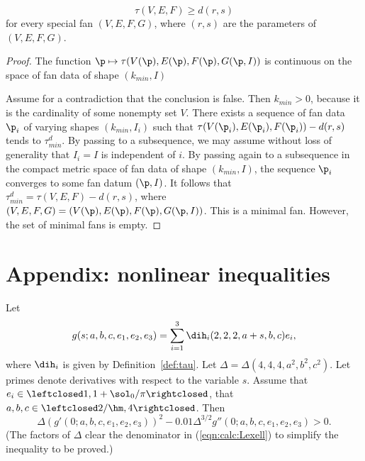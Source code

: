 \begin{corollary}\label{lemma:empty-d}
\begin{displaymath}
\tau(V,E,F) \ge d (r,s)
\end{displaymath}
for every special fan $(V,E,F,G)$, where $(r,s)$ are the parameters of
$(V,E,F,G)$.
\end{corollary}

\begin{proof} 
The function $\p\mapsto \tau(V(\p),E(\p),F(\p),G(\p,I))$ is
continuous on the space of fan data of shape $(k_{min},I)$

Assume for a contradiction that the conclusion is false.  Then
$k_{min}>0$, because it is the cardinality of some nonempty set $V$.
There exists a sequence of fan data $\p_i$ of varying shapes
$(k_{min},I_i)$ such that $\tau(V(\p_i),E(\p_i),F(\p_i))-d(r,s)$
tends to $\tau^d_{min}$.  By passing to a subsequence, we may assume
without loss of generality that $I_i = I$ is independent of $i$.  By
passing again to a subsequence in the compact metric space of fan
data of shape $(k_{min},I)$, the sequence $\p_i$ converges to some
fan datum $(\p,I)$.  It follows that $\tau^d_{min} =
\tau(V,E,F)-d(r,s)$, where $(V,E,F,G)=(V(\p),E(\p),F(\p),G(\p,I))$.
This is a minimal fan.  However, the set of minimal fans is empty.
\end{proof}


\section{Appendix: nonlinear inequalities}

\begin{calculation}\label{calc:Lexell}
Let
\begin{displaymath}
g(s;a,b,c,e_1,e_2,e_3) = \sum_{i=1}^3 \dih_i(2,2,2,a+s,b,c) e_i,
\end{displaymath}
where $\dih_i$ is given by Definition~\ref{def:tau}.
Let $\Delta = \Delta(4,4,4,a^2,b^2,c^2)$.
Let primes denote derivatives with respect to the variable $s$.
Assume that
$e_i\in\leftclosed1,1+\sol_0/\pi\rightclosed$,  that
$a,b,c\in\leftclosed2/\hm,4\rightclosed$.
Then
\begin{equation}\label{eqn:calc:Lexell}
  \Delta (g'(0;a,b,c,e_1,e_2,e_3))^2 
- 0.01\Delta^{3/2}g''(0;a,b,c,e_1,e_2,e_3) > 0.
\end{equation}
(The factors of $\Delta$ clear the denominator in
(\ref{eqn:calc:Lexell}) to simplify the inequality to be proved.)
\end{calculation}

